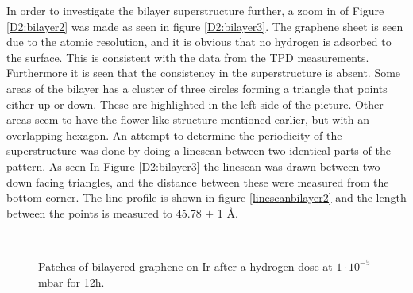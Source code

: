 In order to investigate the bilayer superstructure further, a zoom in of Figure \ref{D2:bilayer2} was made as seen in figure \ref{D2:bilayer3}. The graphene sheet is seen due to the atomic resolution, and it is obvious that no hydrogen is adsorbed to the surface. This is consistent with the data from the TPD measurements. Furthermore it is seen that the consistency in the superstructure is absent. Some areas of the bilayer has a cluster of three circles forming a triangle that points either up or down. These are highlighted in the left side of the picture. Other areas seem to have the flower-like structure mentioned earlier, but with an overlapping hexagon. An attempt to determine the periodicity of the superstructure was done by doing a linescan between two identical parts of the pattern. As seen In Figure \ref{D2:bilayer3} the linescan was drawn between two down facing triangles, and the distance between these were measured from the bottom corner. The line profile is shown in figure \ref{linescanbilayer2} and the length between the points is measured to 45.78 $\pm$ 1 Å.

\begin{figure}[H]
\\
\caption{Patches of bilayered graphene on Ir after a hydrogen dose at $1\cdot 10^{-5}$mbar for 12h.}
\label{D2:bilayer}
\end{figure}


